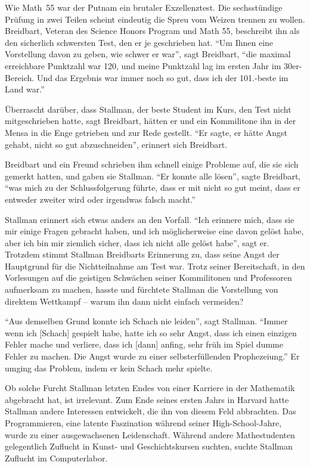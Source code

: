 Wie Math~55 war der Putnam ein brutaler Exzellenztest. Die sechsstündige Prüfung in zwei Teilen scheint eindeutig die Spreu vom Weizen trennen zu wollen. Breidbart, Veteran des Science Honors Program und Math 55, beschreibt ihn als den sicherlich schwersten Test, den er je geschrieben hat. "`Um Ihnen eine Vorstellung davon zu geben, wie schwer er war"', sagt Breidbart, "`die maximal erreichbare Punktzahl war 120, und meine Punktzahl lag im ersten Jahr im 30er-Bereich. Und das Ergebnis war immer noch so gut, dass ich der 101.-beste im Land war."'

Überrascht darüber, dass Stallman, der beste Student im Kurs, den Test nicht mitgeschrieben hatte, sagt Breidbart, hätten er und ein Kommilitone ihn in der Mensa in die Enge getrieben und zur Rede gestellt. "`Er sagte, er hätte Angst gehabt, nicht so gut abzuschneiden"', erinnert sich Breidbart.

Breidbart und ein Freund schrieben ihm schnell einige Probleme auf, die sie sich gemerkt hatten, und gaben sie Stallman. "`Er konnte alle lösen"', sagte Breidbart, "`was mich zu der Schlussfolgerung führte, dass er mit \glq nicht so gut\grq{} meint, dass er entweder zweiter wird oder irgendwas falsch macht."'

Stallman erinnert sich etwas anders an den Vorfall. "`Ich erinnere mich, dass sie mir einige Fragen gebracht haben, und ich möglicherweise eine davon gelöst habe, aber ich bin mir ziemlich sicher, dass ich nicht alle gelöst habe"', sagt er. Trotzdem stimmt Stallman Breidbarts Erinnerung zu, dass seine Angst der Hauptgrund für die Nichtteilnahme am Test war. Trotz seiner Bereitschaft, in den Vorlesungen auf die geistigen Schwächen seiner Kommilitonen und Professoren aufmerksam zu machen, hasste und fürchtete Stallman die Vorstellung von direktem Wettkampf – warum ihn dann nicht einfach vermeiden?

"`Aus demselben Grund konnte ich Schach nie leiden"', sagt Stallman. "`Immer wenn ich [Schach] gespielt habe, hatte ich so sehr Angst, dass ich einen einzigen Fehler mache und verliere, dass ich [dann] anfing, sehr früh im Spiel dumme Fehler zu machen. Die Angst wurde zu einer selbsterfüllenden Prophezeiung."' Er umging das Problem, indem er kein Schach mehr spielte.

Ob solche Furcht Stallman letzten Endes von einer Karriere in der Mathematik abgebracht hat, ist irrelevant. Zum Ende seines ersten Jahrs in Harvard hatte Stallman andere Interessen entwickelt, die ihn von diesem Feld abbrachten. Das Programmieren, eine latente Faszination während seiner High-School-Jahre, wurde zu einer ausgewachsenen Leidenschaft. Während andere Mathestudenten gelegentlich Zuflucht in Kunst- und Geschichtskursen suchten, suchte Stallman Zuflucht im Computerlabor.

